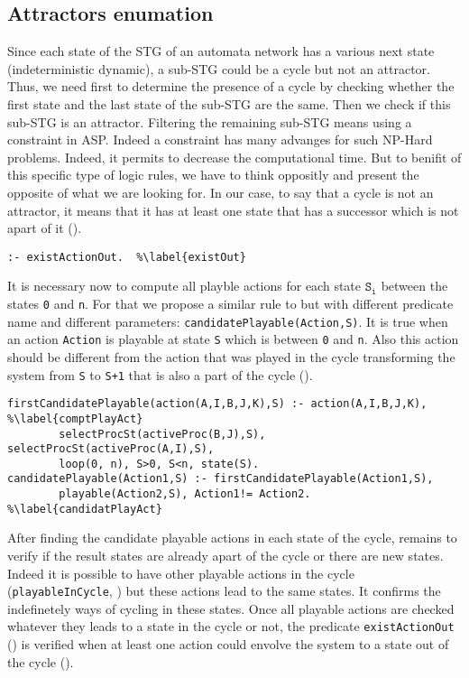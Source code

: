 \subsection{Attractors enumation}
Since each state of the STG of an automata network has a various next state (indeterministic dynamic), a sub-STG could be a cycle but not an attractor. Thus, we need first to determine the presence of a cycle by checking whether the first state and the last state of the sub-STG are the same. Then we check if this sub-STG is an attractor. 
Filtering the remaining sub-STG means using a constraint in ASP. Indeed a constraint has many advanges for such NP-Hard problems. Indeed, it permits to decrease the computational time. But to benifit of this specific type of logic rules, we have to think oppositly and present the opposite of what we are looking for. 
In our case, to say that a cycle is not an attractor, it means that it has at least one state that has a successor which is not apart of it ().
\begin{lstlisting}
:- existActionOut.  %\label{existOut}
\end{lstlisting}
It is necessary now to compute all playble actions for each state $\texttt{S}_\texttt{i}$ between the states \texttt{0} and \texttt{n}. For that we propose a similar rule to  but with different predicate name and different parameters: \texttt{candidatePlayable(Action,S)}. It is true when an action \texttt{Action} is playable at state \texttt{S} which is between \texttt{0} and \texttt{n}. Also this action should be different from the action that was played in the cycle transforming the system from \texttt{S} to \texttt{S+1} that is also a part of the cycle ().
\begin{lstlisting}
firstCandidatePlayable(action(A,I,B,J,K),S) :- action(A,I,B,J,K), %\label{comptPlayAct}
		selectProcSt(activeProc(B,J),S), selectProcSt(activeProc(A,I),S), 
		loop(0, n), S>0, S<n, state(S).		
candidatePlayable(Action1,S) :- firstCandidatePlayable(Action1,S), 
		playable(Action2,S), Action1!= Action2.	%\label{candidatPlayAct}
\end{lstlisting}
After finding the candidate playable actions in each state of the cycle, remains to verify if the result states are already apart of the cycle or there are new states. Indeed it is possible to have other playable actions in the cycle (\texttt{playableInCycle}, ) but these actions lead to the same states. It confirms the indefinetely ways of cycling in these states. Once all playable actions are checked whatever they leads to a state in the cycle or not, the predicate \texttt{existActionOut} () is verified when at least one action could envolve the system to a state out of the cycle ().
